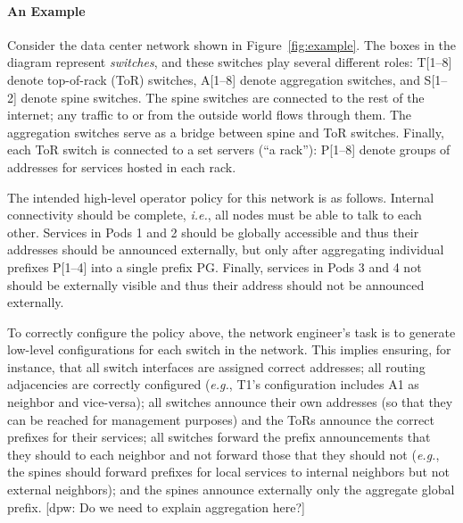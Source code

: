 \documentclass{sig-alternate-10pt}
\newcommand{\todo}[1]{\textcolor{red}{[TODO: #1]}}
\newcommand{\dpw}[1]{\textcolor{tmlblue}{[dpw: #1]}}
\newcommand{\EG}{\emph{e.g.}}
\newcommand{\IE}{\emph{i.e.}}
\newcommand{\sysname}{{\small \sf Methane}\xspace}
\begin{document}
\paragraph*{An Example}
Consider the data center network shown in Figure~\ref{fig:example}.  The boxes in the diagram
represent \emph{switches}, and these switches play several different roles:  T[1--8] denote top-of-rack (ToR) switches, A[1--8] denote aggregation switches, and S[1--2] denote spine switches. The spine switches are connected to the
rest of the internet; any traffic to or from the outside world flows through them.  The aggregation switches
serve as a bridge between spine and ToR switches.   Finally, each ToR switch is
connected to a set servers (``a rack''): P[1--8] denote groups of addresses for services hosted in each rack. 



The intended high-level operator policy for this network is as follows. Internal connectivity should be complete, \IE, all nodes must be able to talk to each other. Services in Pods 1 and 2 should be globally accessible and thus their addresses should be announced externally, but only after aggregating individual prefixes P[1--4] into a single prefix PG. Finally, services in Pods 3 and 4 not should be externally visible and thus their address should not be announced externally.

To correctly configure the policy above, the network engineer's task is to generate low-level configurations for each switch in the network. This implies ensuring, for instance, that all switch interfaces are assigned correct addresses; all routing adjacencies are correctly configured (\EG, T1's configuration includes A1 as neighbor and vice-versa); all switches announce their own addresses (so that they can be reached for management purposes) and the ToRs announce the correct prefixes for their services; all switches  forward the prefix announcements that they should to each neighbor and not forward those that they should not (\EG, the spines should forward prefixes for local services to internal neighbors but not external neighbors); and the spines announce externally only the aggregate global prefix. \dpw{Do we need to explain aggregation here?}
\end{document}
